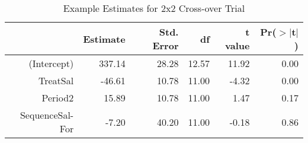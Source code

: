 \begin{table}[ht]
\centering
\begin{tabular}{rrrrrr}
  \hline
 & Estimate & Std. Error & df & t value & Pr($>$$|$t$|$) \\ 
  \hline
(Intercept) & 337.14 & 28.28 & 12.57 & 11.92 & 0.00 \\ 
  TreatSal & -46.61 & 10.78 & 11.00 & -4.32 & 0.00 \\ 
  Period2 & 15.89 & 10.78 & 11.00 & 1.47 & 0.17 \\ 
  SequenceSal-For & -7.20 & 40.20 & 11.00 & -0.18 & 0.86 \\ 
   \hline
\end{tabular}
\caption{Example Estimates for 2x2 Cross-over Trial} 
\label{modelTable}
\end{table}

